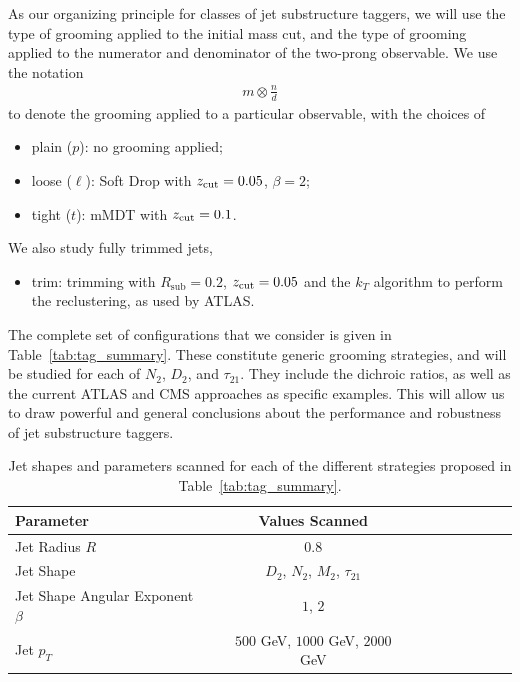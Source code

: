 \documentclass[11pt,letterpaper]{article}
\DeclareRobustCommand{\Tab}[1]{Table~\ref{#1}}
\newcommand{\zcut}{z_{\rm cut}}
\begin{document}
As our organizing principle for classes of  jet substructure taggers, we will use the type of grooming applied to the initial mass cut, and the type of grooming applied to the numerator and denominator of the two-prong observable.
%
We use the notation 
\begin{align}
m \otimes \frac{n}{d}
\end{align}
to denote the grooming applied to a particular observable, with the choices of
%
\begin{itemize}
\item plain ($p$): no grooming applied;
\item loose ($\ell$): Soft Drop with $\zcut=0.05$, $\beta=2$;
\item tight ($t$): mMDT with $\zcut=0.1$.
\end{itemize}
%
We also study fully trimmed jets,
\begin{itemize}
\item trim: trimming with $R_{\text{sub}}=0.2$,  $ \zcut=0.05$ and the $k_T$ algorithm to perform the reclustering, as used by ATLAS.
\end{itemize}
%
The complete set of configurations that we consider is given in \Tab{tab:tag_summary}.
%
These constitute generic grooming strategies, and will be studied for each of $N_2$, $D_2$, and $\tau_{21}$.
%
They include the dichroic ratios, as well as the current ATLAS and CMS approaches as specific examples.
%
This will allow us to draw powerful and general conclusions about the performance and robustness of jet substructure taggers.


\begin{table}
\begin{center}
\begin{tabular}{| l | c | c |c |c|c|c |c|r| }
  \hline                       
  Parameter &  Values Scanned \\
  \hline
  Jet Radius $R$ &   $0.8$ \\
  Jet Shape  &   $D_2$, $N_2$, $M_2$, $\tau_{21}$  \\
  Jet Shape Angular Exponent $\beta$ &   $1$, $2$ \\
  Jet $p_T$ &   $500$ GeV, $1000$ GeV, $2000$ GeV  \\
  \hline  
\end{tabular}
\end{center}
\caption{
Jet shapes and parameters scanned for each of the different strategies proposed in \Tab{tab:tag_summary}. 
}
\label{tab:params}
\end{table}
\end{document}
